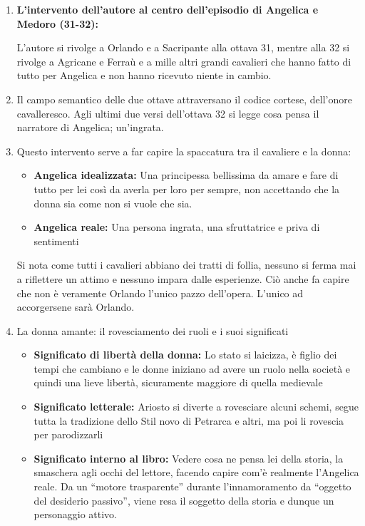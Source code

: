 \documentclass{article}
\begin{document}
\begin{enumerate}
    \item \textbf{L'intervento dell'autore al centro dell'episodio di Angelica e Medoro (31-32):}

    L'autore si rivolge a Orlando e a Sacripante alla ottava 31, mentre alla 32 si rivolge a Agricane e
    Ferraù e a mille altri grandi cavalieri che hanno fatto di tutto per Angelica e non hanno ricevuto
    niente in cambio.
    \item Il campo semantico delle due ottave attraversano il codice cortese, dell'onore cavalleresco.
    Agli ultimi due versi dell'ottava 32 si legge cosa pensa il narratore di Angelica; un'ingrata.
    \item Questo intervento serve a far capire la spaccatura tra il cavaliere e la donna:
    \begin{itemize}
        \item \textbf{Angelica idealizzata:} Una principessa bellissima da amare e fare di tutto per lei così da
        averla per loro per sempre, non accettando che la donna sia come non si vuole che sia.
        \item \textbf{Angelica reale:} Una persona ingrata, una sfruttatrice e priva di sentimenti
    \end{itemize}
    Si nota come tutti i cavalieri abbiano dei tratti di follia, nessuno si ferma mai a riflettere un
    attimo e nessuno impara dalle esperienze. Ciò anche fa capire che non è veramente Orlando
    l'unico pazzo dell'opera. L'unico ad accorgersene sarà Orlando.
    \item La donna amante: il rovesciamento dei ruoli e i suoi significati
    \begin{itemize}
        \item \textbf{Significato di libertà della donna:} Lo stato si laicizza, è figlio dei tempi che cambiano e le
        donne iniziano ad avere un ruolo nella società e quindi una lieve libertà, sicuramente
        maggiore di quella medievale
        \item \textbf{Significato letterale:} Ariosto si diverte a rovesciare alcuni schemi, segue tutta la tradizione
        dello Stil novo di Petrarca e altri, ma poi li rovescia per parodizzarli
        \item \textbf{Significato interno al libro:} Vedere cosa ne pensa lei della storia, la smaschera agli occhi del
        lettore, facendo capire com'è realmente l'Angelica reale.
        Da un ``motore trasparente'' durante l'innamoramento da ``oggetto del desiderio passivo'',
        viene resa il soggetto della storia e dunque un personaggio attivo.
    \end{itemize}
\end{enumerate}
\end{document}
